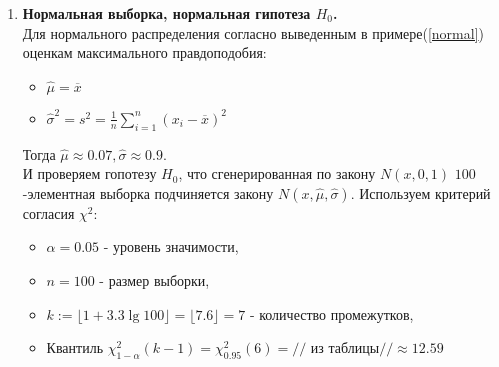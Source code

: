 \documentclass[../body.tex]{subfiles}
\begin{document}
	\begin{enumerate}
		\item \textbf{Нормальная выборка, нормальная гипотеза $H_0$.}\\
		Для нормального распределения согласно выведенным в примере(\ref{normal}) оценкам максимального правдоподобия:
		\begin{itemize}
			\item $\hat{\mu} = \overline{x} $
			\item $\hat{\sigma}^2 = s^2 = \frac{1}{n}\sum_{i = 1}^{n}(x_i - \overline{x})^2$
		\end{itemize}
	Тогда $\hat{\mu} \approx 0.07, \hat{\sigma} \approx 0.9$.\\ И проверяем гопотезу $H_0$, что сгенерированная по закону $N(x, 0, 1)$ $100$-элементная выборка подчиняется закону $N(x, \hat{\mu}, \hat{\sigma})$.
	Используем критерий согласия $\chi^2$:
	\begin{itemize}
		\item $\alpha = 0.05$ - уровень значимости,
		\item $n = 100$ - размер выборки,
		\item $k := \lfloor1+3.3\lg 100\rfloor = \lfloor7.6\rfloor = 7$ - количество промежутков,
		\item Квантиль $\chi_{1 - \alpha}^2(k - 1) = \chi_{0.95}^2(6) = //$ из таблицы\cite[с.~358]{math}$// \approx 12.59$
	\end{itemize}


\end{enumerate}
\end{document}
